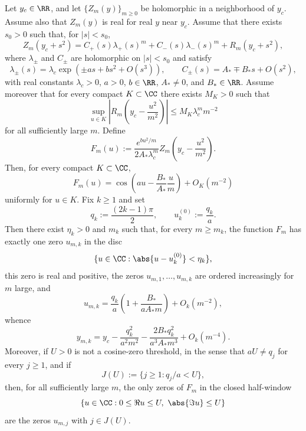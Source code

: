 \begin{lemma}\label{lem:ep2-cosine-law}
Let \(y_c\in\RR\), and let \(\{Z_m(y)\}_{m\ge 0}\) be holomorphic in a neighborhood of \(y_c\).
Assume also that \(Z_m(y)\) is real for real \(y\) near \(y_c\).
Assume that there exists \(s_0>0\) such that, for \(|s|<s_0\),
\[
Z_m(y_c+s^2)=C_+(s)\lambda_+(s)^m + C_-(s)\lambda_-(s)^m + R_m(y_c+s^2),
\]
where \(\lambda_\pm\) and \(C_\pm\) are holomorphic on \(|s|<s_0\) and satisfy
\[
\lambda_\pm(s)=\lambda_c\exp\!\left(\pm as + bs^2 + O(s^3)\right),
\qquad
C_\pm(s)=A_*\mp B_*s+O(s^2),
\]
with real constants \(\lambda_c>0\), \(a>0\), \(b\in\RR\), \(A_*\neq 0\), and \(B_*\in\RR\).
Assume moreover that for every compact \(K\subset\CC\) there exists \(M_K>0\) such that
\[
\sup_{u\in K}
\left|
R_m\!\left(y_c-\frac{u^2}{m^2}\right)
\right|
\le M_K \lambda_c^m m^{-2}
\]
for all sufficiently large \(m\).
Define
\[
F_m(u):=
\frac{e^{b u^2/m}}{2A_*\lambda_c^m}
Z_m\!\left(y_c-\frac{u^2}{m^2}\right).
\]
Then, for every compact \(K\subset\CC\),
\begin{equation}\label{eq:universal-ep2-scaling}
F_m(u)
=
\cos\!\left(
a u-\frac{B_*}{A_*}\frac{u}{m}
\right)+O_K(m^{-2})
\end{equation}
uniformly for \(u\in K\).
Fix \(k\ge 1\) and set
\[
q_k:=\frac{(2k-1)\pi}{2},
\qquad
u_k^{(0)}:=\frac{q_k}{a}.
\]
Then there exist \(\eta_k>0\) and \(m_k\) such that, for every \(m\ge m_k\), the function \(F_m\) has exactly one zero \(u_{m,k}\) in the disc
\[
\{u\in\CC:\abs{u-u_k^{(0)}}<\eta_k\},
\]
this zero is real and positive, the zeros \(u_{m,1},\ldots,u_{m,k}\) are ordered increasingly for \(m\) large, and
\begin{equation}\label{eq:universal-ep2-u}
u_{m,k}
=
\frac{q_k}{a}
\left(
1+\frac{B_*}{aA_*m}
\right)
+O_k(m^{-2}),
\end{equation}
whence
\begin{equation}\label{eq:universal-ep2-y}
y_{m,k}
=
y_c-\frac{q_k^2}{a^2m^2}
-\frac{2B_*q_k^2}{a^3A_*m^3}
+O_k(m^{-4}).
\end{equation}
Moreover, if \(U>0\) is not a cosine-zero threshold, in the sense that \(aU\neq q_j\) for every \(j\ge1\), and if
\[
J(U):=\{j\ge1:q_j/a<U\},
\]
then, for all sufficiently large \(m\), the only zeros of \(F_m\) in the closed half-window
\[
\{u\in\CC:0\le \Re u\le U,\ \abs{\Im u}\le U\}
\]
are the zeros \(u_{m,j}\) with \(j\in J(U)\).
\end{lemma}

